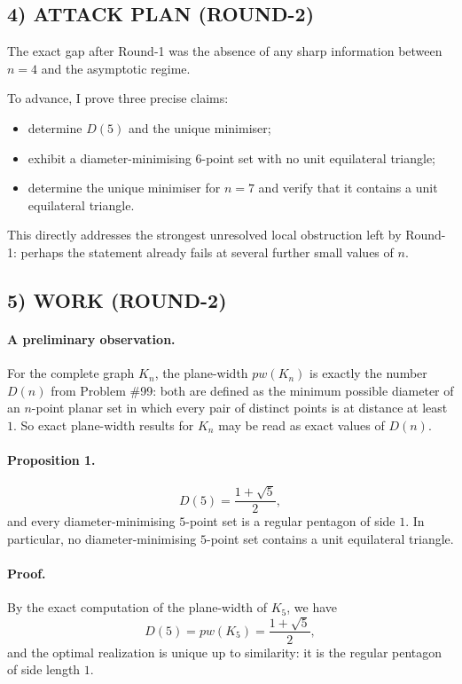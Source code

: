 \subsection*{4) ATTACK PLAN (ROUND-2)}

The exact gap after Round-1 was the absence of any sharp information between $n=4$ and the asymptotic regime.

To advance, I prove three precise claims:
\begin{itemize}
\item determine $D(5)$ and the unique minimiser;
\item exhibit a diameter-minimising $6$-point set with no unit equilateral triangle;
\item determine the unique minimiser for $n=7$ and verify that it contains a unit equilateral triangle.
\end{itemize}

This directly addresses the strongest unresolved local obstruction left by Round-1: perhaps the statement already fails at several further small values of $n$.

\subsection*{5) WORK (ROUND-2)}

\paragraph{A preliminary observation.}
For the complete graph $K_n$, the plane-width $pw(K_n)$ is exactly the number $D(n)$ from Problem \#99: both are defined as the minimum possible diameter of an $n$-point planar set in which every pair of distinct points is at distance at least $1$.
So exact plane-width results for $K_n$ may be read as exact values of $D(n)$.

\paragraph{Proposition 1.}
\[
D(5)=\frac{1+\sqrt5}{2},
\]
and every diameter-minimising $5$-point set is a regular pentagon of side $1$.
In particular, no diameter-minimising $5$-point set contains a unit equilateral triangle.

\paragraph{Proof.}
By the exact computation of the plane-width of $K_5$, we have
\[
D(5)=pw(K_5)=\frac{1+\sqrt5}{2},
\]
and the optimal realization is unique up to similarity: it is the regular pentagon of side length $1$.

